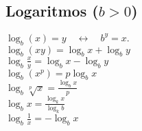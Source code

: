 \subsection{Logaritmos ($b > 0$)}
$\log_b(x) = y \quad \leftrightarrow \quad b^y = x.$\\
$\log_b(xy) = \log_b x + \log_b y$\\
$\log_b \!\frac{x}{y} = \log_b x - \log_b y$\\
$\log_b\left(x^p\right) = p \log_b x$\\
$\log_b \sqrt[p]{x} = \frac{\log_b x}{p}$\\
$\log_b x = \frac{\log_k x}{\log_k b}$\\
$\log_b \frac{1}{x} = -\log_b x$
